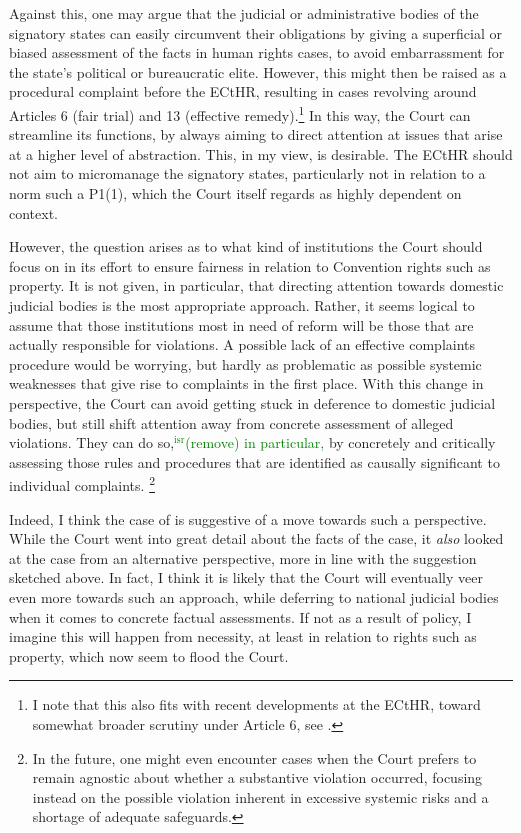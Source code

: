 \documentclass[12pt,a4paper]{book} %
\newcommand{\isr}[1]{\textcolor{green}{$^{\textrm{isr}}${#1}}}
\begin{document}
Against this, one may argue that the judicial or administrative bodies of the signatory states can easily circumvent their obligations by giving a superficial or biased assessment of the facts in human rights cases, to avoid embarrassment for the state's political or bureaucratic elite. However, this might then be raised as a procedural complaint before the ECtHR, resulting in cases revolving around Articles 6 (fair trial) and 13 (effective remedy).\footnote{I note that this also fits with recent developments at the ECtHR, toward somewhat broader scrutiny under Article 6, see \cite{khamidov07}.}  In this way, the Court can streamline its functions, by always aiming to direct attention at issues that arise at a higher level of abstraction. This, in my view, is desirable. The ECtHR should not aim to micromanage the signatory states, particularly not in relation to a norm such a P1(1), which the Court itself regards as highly dependent on context.

However, the question arises as to what kind of institutions the Court should focus on in its effort to ensure fairness in relation to Convention rights such as property. It is not given, in particular, that directing attention towards domestic judicial bodies is the most appropriate approach. Rather, it seems logical to assume that those institutions most in need of reform will be those that are actually responsible for violations. A possible lack of an effective complaints procedure would be worrying, but hardly as problematic as possible systemic weaknesses that give rise to complaints in the first place. With this change in perspective, the Court can avoid getting stuck in deference to domestic judicial bodies, but still shift attention away from concrete assessment of alleged violations. They can do so,\isr{(remove) in particular,} by concretely and critically assessing those rules and procedures that are identified as causally significant to individual complaints. \footnote{In the future, one might even encounter cases when the Court prefers to remain agnostic about whether a substantive violation occurred, focusing instead on the possible violation inherent in excessive systemic risks and a shortage of adequate safeguards.}

Indeed, I think the case of \textcite{hutten06} is suggestive of a move towards such a perspective. While the Court went into great detail about the facts of the case, it {\it also} looked at the case from an alternative perspective, more in line with the suggestion sketched above. In fact, I think it is likely that the Court will eventually veer even more towards such an approach, while deferring to national judicial bodies when it comes to concrete factual assessments. If not as a result of policy, I imagine this will happen from necessity, at least in relation to rights such as property, which now seem to flood the Court.
\end{document}
